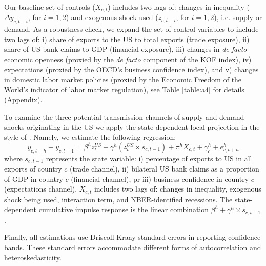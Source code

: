 \documentclass[12pt, a4paper]{article}
\begin{document}
Our baseline set of controls ($X_{c,t}$) includes two lags of: changes in inequality ($\Delta y_{c,t-i}$, for $i =1,2$) and exogenous shock used ($z_{c,t-i}$, for $i =1,2$), i.e. supply or demand. As a robustness check, we expand the set of control variables to include two lags of: i) share of exports to the US to total exports (trade exposure), ii) share of US bank claims to GDP (financial exposure), iii) changes in \textit{de facto} economic openness (proxied by the \textit{de facto} component of the KOF index), iv) expectations (proxied by the OECD's business confidence index), and v) changes in domestic labor market policies (proxied by the Economic Freedom of the World's indicator of labor market regulation), see Table \ref{table:a4} for details (Appendix).

To examine the three potential transmission channels of supply and demand shocks originating in the US we apply the state-dependent local projection in the style of \textcite{auerbach2013output}. Namely, we estimate the following regression:
\begin{equation}
    y_{c,t+h}-y_{c,t-1} = \beta^h z^{US}_{t} + \gamma^h (z^{US}_{t} \times s_{c,t-1}) + \pi^h X_{c,t} + \gamma^h_c + e^h_{c, t+h}
\label{eq:2}
\end{equation}
where $s_{c,t-1}$ represents the state variable: i) percentage of exports to US in all exports of country $c$ (trade channel), ii) bilateral US bank claims as a proportion of GDP in country $c$ (financial channel), pr iii) business confidence in country $c$ (expectations channel). $X_{c,t}$ includes two lags of: changes in inequality, exogenous shock being used, interaction term, and NBER-identified recessions. The state-dependent cumulative impulse response is the linear combination $\beta^h + \gamma^h \times s_{c,t-1}$.

Finally, all estimations use Driscoll-Kraay standard errors in reporting confidence bands. These standard errors accommodate different forms of autocorrelation and heteroskedasticity.

\end{document}
